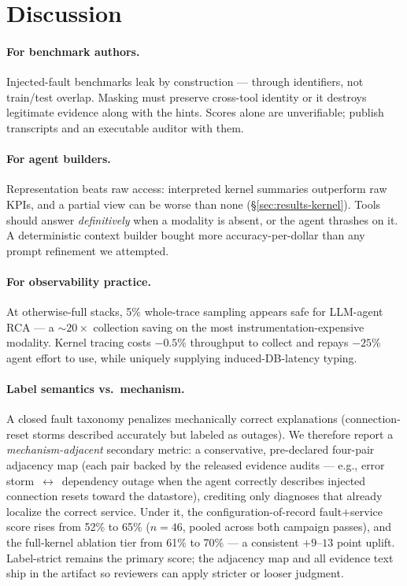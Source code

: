 \section{Discussion}
\label{sec:discussion}

\paragraph{For benchmark authors.} Injected-fault benchmarks leak by construction ---
through identifiers, not train/test overlap. Masking must preserve cross-tool identity
or it destroys legitimate evidence along with the hints. Scores alone are
unverifiable; publish transcripts and an executable auditor with them.

\paragraph{For agent builders.} Representation beats raw access: interpreted kernel
summaries outperform raw KPIs, and a partial view can be worse than none
(\S\ref{sec:results-kernel}). Tools should answer \emph{definitively} when a modality
is absent, or the agent thrashes on it. A deterministic context builder bought more
accuracy-per-dollar than any prompt refinement we attempted.

\paragraph{For observability practice.} At otherwise-full stacks, 5\% whole-trace
sampling appears safe for LLM-agent RCA --- a ${\sim}20\times$ collection saving on
the most instrumentation-expensive modality. Kernel tracing costs $-0.5$\% throughput
to collect and repays $-25$\% agent effort to use, while uniquely supplying
induced-DB-latency typing.

\paragraph{Label semantics vs.\ mechanism.} A closed fault taxonomy penalizes
mechanically correct explanations (connection-reset storms described accurately but
labeled as outages). We therefore report a \emph{mechanism-adjacent} secondary metric:
a conservative, pre-declared four-pair adjacency map (each pair backed by the released
evidence audits --- e.g., error storm~$\leftrightarrow$~dependency outage when the
agent correctly describes injected connection resets toward the datastore), crediting
only diagnoses that already localize the correct service. Under it, the
configuration-of-record fault$+$service score rises from 52\% to 65\% ($n{=}46$,
pooled across both campaign passes), and the full-kernel ablation tier from 61\% to
70\% --- a consistent ${+}9$--$13$ point uplift. Label-strict remains the primary
score; the adjacency map and all evidence text ship in the artifact so reviewers can
apply stricter or looser judgment.
